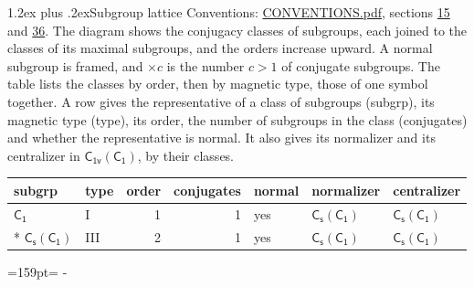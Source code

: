\documentclass[10pt,a4paper]{article}
\makeatletter
\renewcommand\section{\@startsection{section}{1}{\z@}{-3ex plus -1ex minus -.2ex}%
  {1.2ex plus .2ex}{\normalfont\large\sffamily\bfseries\color{parttitle}}}
\newcommand{\needspace}[1]{\par\penalty-100\begingroup\dimen0=#1\relax\dimen2=\pagegoal
  \advance\dimen2-\pagetotal\ifdim\dimen0>\dimen2\relax\ifdim\dimen2>0pt\vfil\break\fi\fi
  \endgroup}
\numberwithin{equation}{section}
\newcommand{\grp}[1]{\mathsf{#1}}
\makeatother
\begin{document}
\section{Subgroup lattice}\label{s:subgroups}
Conventions: \href{../../CONVENTIONS.pdf}{CONVENTIONS.pdf}, sections \href{../../../rotation/CONVENTIONS.pdf\#conv.15}{15} and \href{../../CONVENTIONS.pdf\#conv.36}{36}.
The diagram shows the conjugacy classes of subgroups, each joined to the classes of its maximal subgroups, and the orders increase upward. \label{n:index.conjugates.c}A normal subgroup is framed, and ${\times}c$ is the number $c > 1$ of conjugate subgroups. The table lists the classes by order, then by magnetic type, those of one symbol together. \label{n:head.subgroup}\label{n:head.magnetic.type}\label{n:head.order}\label{n:head.conjugates}\label{n:head.normal}A row gives the representative of a class of subgroups (subgrp), its magnetic type (type), its order, the number of subgroups in the class (conjugates) and whether the representative is normal. \label{n:head.normalizer}\label{n:head.centralizer}It also gives its normalizer and its centralizer in $\grp{C_{1v}}(\grp{C_{1}})$, by their classes. 
\begin{center}
\end{center}
{\small\begin{longtable}{@{}llrrlll@{}}\toprule
subgrp & type & order & conjugates & normal & normalizer & centralizer\\\midrule\endhead
\bottomrule\endfoot\endlastfoot
\href{../../../rotation/data/pdf/C1.pdf}{$\grp{C_{1}}$} & I & 1 & 1 & yes & \href{C1v-C1.pdf}{$\grp{C_{s}}(\grp{C_{1}})$} & \href{C1v-C1.pdf}{$\grp{C_{s}}(\grp{C_{1}})$}\\*
\href{C1v-C1.pdf}{$\grp{C_{s}}(\grp{C_{1}})$} & III & 2 & 1 & yes & \href{C1v-C1.pdf}{$\grp{C_{s}}(\grp{C_{1}})$} & \href{C1v-C1.pdf}{$\grp{C_{s}}(\grp{C_{1}})$}\\
\bottomrule\end{longtable}}
\needspace{159pt}
\end{document}
